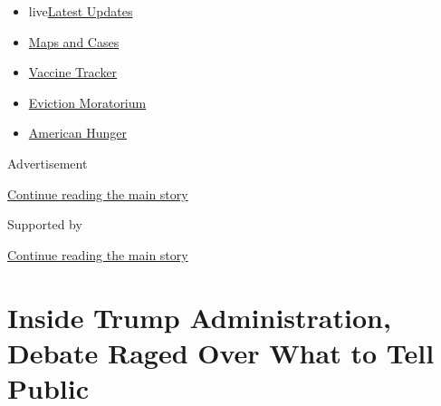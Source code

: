 \begin{itemize}
\tightlist
\item
  live\href{https://www.nytimes3xbfgragh.onion/2020/09/09/world/covid-19-coronavirus.html?name=styln-coronavirus-national\&region=TOP_BANNER\&block=storyline_menu_recirc\&action=click\&pgtype=Article\&impression_id=40616691-f297-11ea-96c9-f92c07a4cad0\&variant=undefined}{Latest
  Updates}
\item
  \href{https://www.nytimes3xbfgragh.onion/interactive/2020/us/coronavirus-us-cases.html?name=styln-coronavirus-national\&region=TOP_BANNER\&block=storyline_menu_recirc\&action=click\&pgtype=Article\&impression_id=40616692-f297-11ea-96c9-f92c07a4cad0\&variant=undefined}{Maps
  and Cases}
\item
  \href{https://www.nytimes3xbfgragh.onion/interactive/2020/science/coronavirus-vaccine-tracker.html?name=styln-coronavirus-national\&region=TOP_BANNER\&block=storyline_menu_recirc\&action=click\&pgtype=Article\&impression_id=40618da0-f297-11ea-96c9-f92c07a4cad0\&variant=undefined}{Vaccine
  Tracker}
\item
  \href{https://www.nytimes3xbfgragh.onion/2020/09/02/your-money/eviction-moratorium-covid.html?name=styln-coronavirus-national\&region=TOP_BANNER\&block=storyline_menu_recirc\&action=click\&pgtype=Article\&impression_id=40618da1-f297-11ea-96c9-f92c07a4cad0\&variant=undefined}{Eviction
  Moratorium}
\item
  \href{https://www.nytimes3xbfgragh.onion/interactive/2020/09/02/magazine/food-insecurity-hunger-us.html?name=styln-coronavirus-national\&region=TOP_BANNER\&block=storyline_menu_recirc\&action=click\&pgtype=Article\&impression_id=40618da2-f297-11ea-96c9-f92c07a4cad0\&variant=undefined}{American
  Hunger}
\end{itemize}

Advertisement

\protect\hyperlink{after-top}{Continue reading the main story}

Supported by

\protect\hyperlink{after-sponsor}{Continue reading the main story}

\hypertarget{inside-trump-administration-debate-raged-over-what-to-tell-public}{%
\section{Inside Trump Administration, Debate Raged Over What to Tell
Public}\label{inside-trump-administration-debate-raged-over-what-to-tell-public}}

